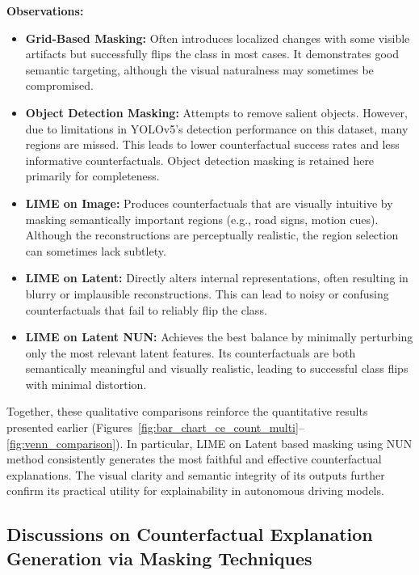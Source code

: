 \textbf{Observations:}
\begin{itemize}
    \item \textbf{Grid-Based Masking:} Often introduces localized changes with some visible artifacts but successfully flips the class in most cases. It demonstrates good semantic targeting, although the visual naturalness may sometimes be compromised.
    \item \textbf{Object Detection Masking:} Attempts to remove salient objects. However, due to limitations in YOLOv5's detection performance on this dataset, many regions are missed. This leads to lower counterfactual success rates and less informative counterfactuals. Object detection masking is retained here primarily for completeness.
    \item \textbf{LIME on Image:} Produces counterfactuals that are visually intuitive by masking semantically important regions (e.g., road signs, motion cues). Although the reconstructions are perceptually realistic, the region selection can sometimes lack subtlety.
    \item \textbf{LIME on Latent:} Directly alters internal representations, often resulting in blurry or implausible reconstructions. This can lead to noisy or confusing counterfactuals that fail to reliably flip the class.
    \item \textbf{LIME on Latent NUN:} Achieves the best balance by minimally perturbing only the most relevant latent features. Its counterfactuals are both semantically meaningful and visually realistic, leading to successful class flips with minimal distortion.
\end{itemize}

\vspace{1em}

Together, these qualitative comparisons reinforce the quantitative results presented earlier (Figures~\ref{fig:bar_chart_ce_count_multi}--\ref{fig:venn_comparison}). In particular, LIME on Latent based masking using NUN method consistently generates the most faithful and effective counterfactual explanations. The visual clarity and semantic integrity of its outputs further confirm its practical utility for explainability in autonomous driving models.


\subsection{Discussions on Counterfactual Explanation Generation via Masking Techniques}

